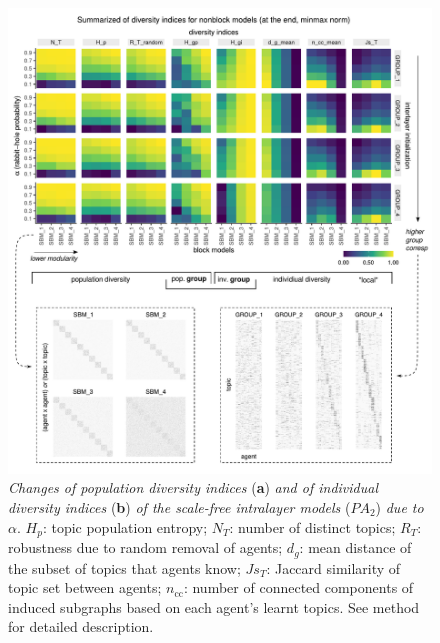 \begin{figure}[!ht]
    \centering
    \includegraphics[width=\textwidth]{figures/Fig3.pdf}
    \caption{\label{fig:3}
    \textit{Changes of population diversity indices} (\textbf{a}) \textit{and of individual diversity indices} (\textbf{b}) \textit{of the scale-free intralayer models} ($PA_2$) \textit{due to} $\alpha$. $H_p$: topic population entropy; $N_T$: number of distinct topics; $R_T$: robustness due to random removal of agents; $d_g$: mean distance of the subset of topics that agents know; $Js_T$: Jaccard similarity of topic set between agents; $n_{\mathrm{cc}}$: number of connected components of induced subgraphs based on each agent's learnt topics. See method for detailed description.
    }
\end{figure}

